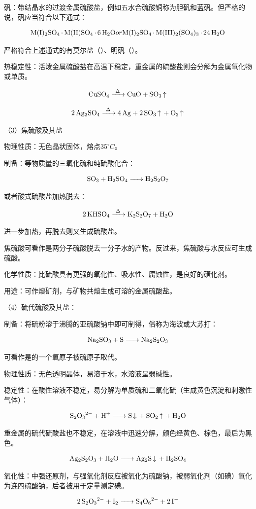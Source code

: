 \documentclass[a4paper,UTF8]{article}
\begin{document}
矾：带结晶水的过渡金属硫酸盐，例如五水合硫酸铜称为胆矾和蓝矾。但严格的说，矾应当符合以下通式：

$$ \ce{M(I)2SO4 * M(II)SO4 * 6H2O} or \ce{M(I)2SO4 * M(III)2(SO4)3 * 24H2O}$$

严格符合上述通式的有莫尔盐（）、明矾（）。

热稳定性：活泼金属硫酸盐在高温下稳定，重金属的硫酸盐则会分解为金属氧化物或单质。

$$ \ce{CuSO4 ->[\Delta] CuO + SO3 ^} $$

$$ \ce{2Ag2SO4 ->[\Delta] 4Ag + 2SO3 ^ + O2 ^} $$

（3）焦硫酸及其盐

物理性质：无色晶状固体，熔点$35^\circ C$。

制备：等物质量的三氧化硫和纯硫酸化合：

$$ \ce{SO3 + H2SO4 -> H2S2O7} $$

或者酸式硫酸盐加热脱去：

$$ \ce{2KHSO4 ->[\Delta] K2S2O7 + H2O} $$

进一步加热，再脱去则又生成硫酸盐。

焦硫酸可看作是两分子硫酸脱去一分子水的产物。反过来，焦硫酸与水反应可生成硫酸。

化学性质：比硫酸具有更强的氧化性、吸水性、腐蚀性，是良好的磺化剂。

用途：可作熔矿剂，与矿物共熔生成可溶的金属硫酸盐。

（4）硫代硫酸及其盐：

制备：将硫粉溶于沸腾的亚硫酸钠中即可制得，俗称为海波或大苏打：

$$ \ce{Na2SO3 + S -> Na2S2O3} $$

可看作是的一个氧原子被硫原子取代。

物理性质：无色透明晶体，易溶于水，水溶液呈弱碱性。

稳定性：在酸性溶液不稳定，易分解为单质硫和二氧化硫（生成黄色沉淀和刺激性气体）：

$$ \ce{S2O3^2- + H+ -> S v + SO2 ^ + H2O} $$

重金属的硫代硫酸盐也不稳定，在溶液中迅速分解，颜色经黄色、棕色，最后为黑色。

$$ \ce{Ag2S2O3 + H2O -> Ag2S v + H2SO4} $$

氧化性：中强还原剂，与强氧化剂反应被氧化为硫酸钠，被弱氧化剂（如碘）氧化为连四硫酸钠，后者被用于定量测定碘。

$$ \ce{2S2O3^2- + I2 -> S4O6^2- + 2I-} $$
\end{document}
